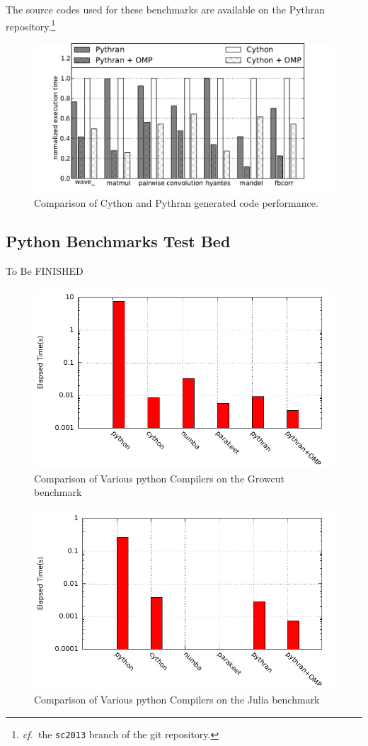 \documentclass[conference]{IEEEtran}
\newcommand\see{\emph{cf.\ }}
\begin{document}
The source codes used for these benchmarks are available on the Pythran
repository.\footnote{\see the \texttt{sc2013} branch of the git repository.} 

\begin{figure}[ht]
    \includegraphics[width=.5\textwidth]{cython}
    \caption{Comparison of Cython and Pythran generated code performance.}
    \label{fig:cython-pythran}
\end{figure}


\subsection{Python Benchmarks Test Bed}

To Be FINISHED

\begin{figure}[ht]
    \includegraphics[width=.5\textwidth]{growcut}
    \caption{Comparison of Various python Compilers on the Growcut benchmark}
    \label{fig:pb-growcut}
\end{figure}

\begin{figure}[ht]
    \includegraphics[width=.5\textwidth]{julia}
    \caption{Comparison of Various python Compilers on the Julia benchmark}
    \label{fig:pb-julia}
\end{figure}
\end{document}
